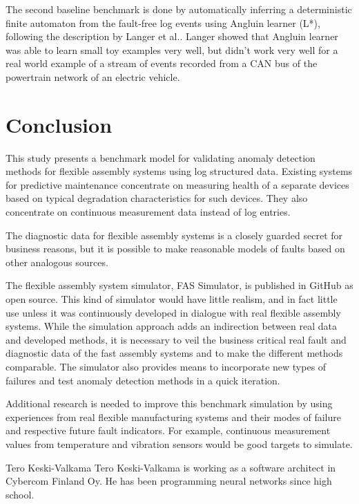 \documentclass[journal]{IEEEtran}
\begin{document}
The second baseline benchmark is done by automatically inferring a deterministic finite automaton from the fault-free log events using Angluin learner (L*)\cite{Angluin},
following the description by Langer et al.\cite{langer2011self}. Langer showed that Angluin learner was able to learn small toy examples very well, but didn't work very well
for a real world example of a stream of events recorded from a CAN bus of the powertrain network of an electric vehicle.

\section{Conclusion}

This study presents a benchmark model for validating anomaly detection methods for flexible assembly systems using log structured data.
Existing systems for predictive maintenance concentrate on measuring health of a separate devices based on typical degradation characteristics
for such devices. They also concentrate on continuous measurement data instead of log entries.

The diagnostic data for flexible assembly systems is a closely guarded secret for business reasons, but it is possible to make reasonable models
of faults based on other analogous sources.

The flexible assembly system simulator, FAS Simulator, is published in GitHub\cite{FASSimulator} as open source. This kind of simulator would have
little realism, and in fact little use unless it was continuously developed in dialogue with real flexible assembly systems. While the simulation
approach adds an indirection between real data and developed methods, it is necessary to veil the business critical real fault and diagnostic
data of the fast assembly systems and to make the different methods comparable. The simulator also provides means to incorporate new types of
failures and test anomaly detection methods in a quick iteration.

Additional research is needed to improve this benchmark simulation by using experiences from real flexible manufacturing systems and their modes of failure
and respective future fault indicators. For example, continuous measurement values from temperature and vibration sensors would be good targets
to simulate.

\appendices




\begin{IEEEbiography}{Tero Keski-Valkama}
Tero Keski-Valkama is working as a software architect in Cybercom Finland Oy. He has been programming neural networks since high school.
\end{IEEEbiography}
\end{document}
